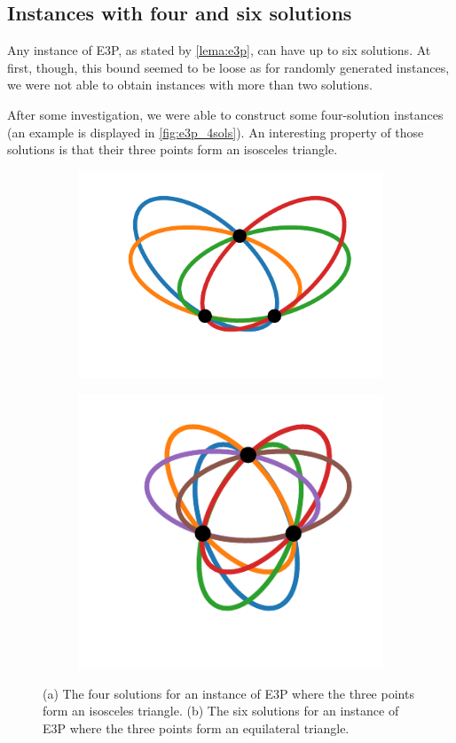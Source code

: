 \subsection{Instances with four and six solutions}

Any instance of E3P, as stated by \autoref{lema:e3p}, can have up to six solutions. At first, though, this bound seemed to be loose as for randomly generated instances, we were not able to obtain instances with more than two solutions.

After some investigation, we were able to construct some four-solution instances (an example is displayed in \autoref{fig:e3p_4sols}). An interesting property of those solutions is that their three points form an isosceles triangle.

\begin{figure}[!htb]
	\begin{subfigure}{.5\textwidth}
		\centering
		\includegraphics[scale=.9]{figures/e3p_4sols}
		\caption{}
		\label{fig:e3p_4sols}
	\end{subfigure}
	\begin{subfigure}{.5\textwidth}
		\centering
		\includegraphics[scale=.9]{figures/e3p_6sols}
		\caption{}
		\label{fig:e3p_6sols}
	\end{subfigure}
\caption{(a) The four solutions for an instance of E3P where the three points form an isosceles triangle. (b) The six solutions for an instance of E3P where the three points form an equilateral triangle.}
\end{figure}


